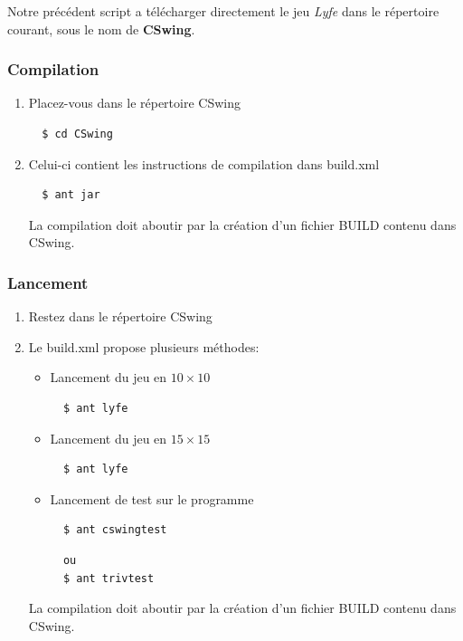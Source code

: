 \documentclass[a4paper,11pt,french]{report}
\begin{document}
Notre précédent script a télécharger directement le jeu \emph{Lyfe} dans le répertoire courant, sous le nom de \textbf{CSwing}.\\

\subsubsection{Compilation}
\label{subsubsec:cswing}
\begin{enumerate}
\item Placez-vous dans le répertoire CSwing
  \begin{verbatim} 
  $ cd CSwing
  \end{verbatim}
\item  Celui-ci contient les instructions de compilation dans \textsf{build.xml}
  \begin{verbatim} 
  $ ant jar
  \end{verbatim}
La compilation doit aboutir par la création d'un fichier BUILD contenu dans CSwing.
\end{enumerate}

\subsubsection{Lancement}

\begin{enumerate}
\item Restez dans le répertoire CSwing
\item Le \textsf{build.xml} propose plusieurs méthodes: 
\begin{itemize}
\item Lancement du jeu en $10 \times 10$
  \begin{verbatim} 
  $ ant lyfe
  \end{verbatim}
\item Lancement du jeu en $15 \times 15$
  \begin{verbatim} 
  $ ant lyfe
  \end{verbatim}
\item Lancement de test sur le programme
  \begin{verbatim} 
  $ ant cswingtest
  \end{verbatim}
  \begin{verbatim} 
  ou
  $ ant trivtest
  \end{verbatim}
\end{itemize}
La compilation doit aboutir par la création d'un fichier BUILD contenu dans CSwing.
\end{enumerate}
\end{document}

